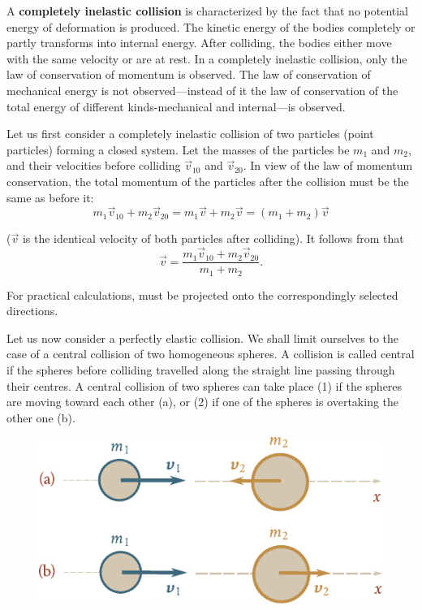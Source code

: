 A \textbf{completely inelastic collision} is characterized by the fact that no potential energy of deformation is produced. The kinetic energy of the bodies completely or partly transforms into internal energy. After colliding, the bodies either move with the same velocity or are at rest. In a completely inelastic collision, only the law of conservation of momentum is observed. The law of conservation of mechanical energy is not observed---instead of it the law of conservation of the total energy of different kinds-mechanical and internal---is observed.

Let us first consider a completely inelastic collision of two particles (point particles) forming a closed system. Let the masses of the particles be $m_1$ and $m_2$, and their velocities before colliding $\vec{v}_{10}$ and $\vec{v}_{20}$. In view of the law of momentum conservation, the total momentum of the particles after the collision must be the same as before it:
\begin{equation}\label{eq:3_93}
m_1\vec{v}_{10} + m_2\vec{v}_{20} = m_1\vec{v} + m_2\vec{v} = (m_1+m_2) \vec{v}
\end{equation}

\noindent
($\vec{v}$ is the identical velocity of both particles after colliding). It follows from  that
\begin{equation}\label{eq:3_94}
\vec{v} = \frac{m_1\vec{v}_{10} + m_2\vec{v}_{20}}{m_1+m_2}.
\end{equation}

\noindent
For practical calculations,  must be projected onto the correspondingly selected directions.


Let us now consider a perfectly elastic collision. We shall limit ourselves to the case of a central collision of two homogeneous spheres. A collision is called central if the spheres before colliding travelled along the straight line passing through their centres. A central collision of two spheres can take place (1) if the spheres are moving toward each other (a), or (2) if one of the spheres is overtaking the other one (b).

\begin{figure}[t]
	\begin{center}
		\includegraphics[scale=1]{figures/ch_03/fig_3_16.pdf}
		\caption[]{}
		\label{fig:3_16}
	\end{center}
	\vspace{-0.7cm}
\end{figure}

